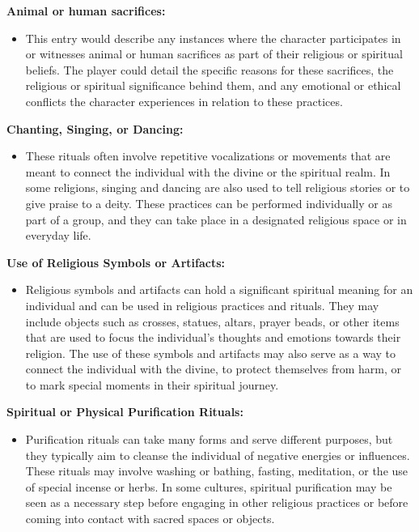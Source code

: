 \textbf{Animal or human sacrifices:}

\begin{itemize}
\tightlist
\item
  This entry would describe any instances where the character
  participates in or witnesses animal or human sacrifices as part of
  their religious or spiritual beliefs. The player could detail the
  specific reasons for these sacrifices, the religious or spiritual
  significance behind them, and any emotional or ethical conflicts the
  character experiences in relation to these practices.
\end{itemize}

\textbf{Chanting, Singing, or Dancing:}

\begin{itemize}
\tightlist
\item
  These rituals often involve repetitive vocalizations or movements that
  are meant to connect the individual with the divine or the spiritual
  realm. In some religions, singing and dancing are also used to tell
  religious stories or to give praise to a deity. These practices can be
  performed individually or as part of a group, and they can take place
  in a designated religious space or in everyday life.
\end{itemize}

\textbf{Use of Religious Symbols or Artifacts:}

\begin{itemize}
\tightlist
\item
  Religious symbols and artifacts can hold a significant spiritual
  meaning for an individual and can be used in religious practices and
  rituals. They may include objects such as crosses, statues, altars,
  prayer beads, or other items that are used to focus the individual's
  thoughts and emotions towards their religion. The use of these symbols
  and artifacts may also serve as a way to connect the individual with
  the divine, to protect themselves from harm, or to mark special
  moments in their spiritual journey.
\end{itemize}

\textbf{Spiritual or Physical Purification Rituals:}

\begin{itemize}
\tightlist
\item
  Purification rituals can take many forms and serve different purposes,
  but they typically aim to cleanse the individual of negative energies
  or influences. These rituals may involve washing or bathing, fasting,
  meditation, or the use of special incense or herbs. In some cultures,
  spiritual purification may be seen as a necessary step before engaging
  in other religious practices or before coming into contact with sacred
  spaces or objects.
\end{itemize}

